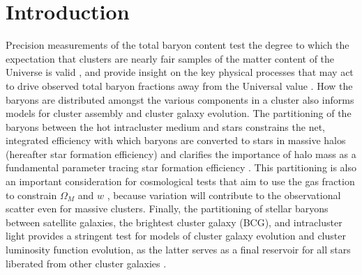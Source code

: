 \documentclass[preprint]{emulateapj}
\begin{document}


\section{Introduction}
\label{sec:intro}

Precision measurements of the total baryon content test the degree to
which the expectation that clusters are nearly fair samples of the
matter content of the Universe is valid \citep{white1991}, and provide
insight on the key physical processes that may act to drive observed
total baryon fractions away from the Universal value \citep[e.g.,][and
references
therein]{nagai2007,mcnamara2007,mcnamara2012,mccarthy2008,mccarthy2011,simionescu2011}.
How the baryons are distributed amongst the various components in a
cluster also informs models for cluster assembly and cluster galaxy
evolution.  The partitioning of the baryons between the hot
intracluster medium and stars constrains the net, integrated efficiency with
which baryons are converted to stars
in massive halos (hereafter star formation efficiency) 
and clarifies the importance of halo mass
as a fundamental parameter tracing  star formation efficiency
\citep{bryan2000,lin2003}. This partitioning is also an important
consideration for cosmological tests that aim to use the gas fraction
to constrain $\Omega_M$ and $w$ \citep[e.g.,][]{allen2008}, because
variation will contribute to the observational scatter even for
massive clusters.  Finally, the partitioning of stellar baryons
between satellite galaxies, the brightest cluster galaxy (BCG), and
intracluster light provides a stringent test for models of cluster
galaxy evolution and cluster luminosity function evolution, as the
latter serves as a final reservoir for all stars liberated from other
cluster galaxies
\citep{conroy2007,purcell2007,behroozi2012,watson2012}.
\end{document}
